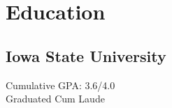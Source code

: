 
\section{Education} 


\subsection{Iowa State University}

Cumulative GPA: 3.6/4.0 \\
Graduated Cum Laude \\

\sectionspace



